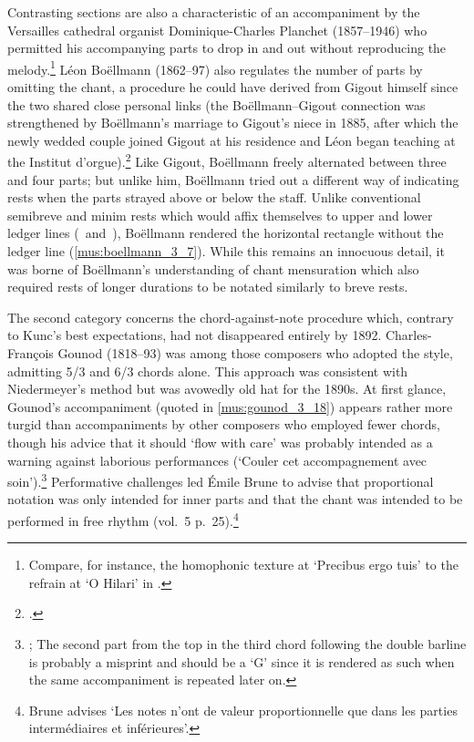 Contrasting sections are also a characteristic of an accompaniment by the Versailles cathedral organist Dominique-Charles Planchet (1857--1946) who permitted his accompanying parts to drop in and out without reproducing the melody.\footnote{Compare, for instance, the homophonic texture at `Precibus ergo tuis' to the refrain at `O Hilari' in \cite[4:6--9]{Melodieschantgregorien1892}.}
Léon Boëllmann (1862--97) also regulates the number of parts by omitting the chant, a procedure he could have derived from Gigout himself since the two shared close personal links (the Boëllmann--Gigout connection was strengthened by Boëllmann's marriage to Gigout's niece in 1885, after which the newly wedded couple joined Gigout at his residence and Léon began teaching at the Institut d'orgue).\footcite[216--17]{OchseOrganistsOrganPlaying2000}
Like Gigout, Boëllmann freely alternated between three and four parts; but unlike him, Boëllmann tried out a different way of indicating rests when the parts strayed above or below the staff.
Unlike conventional semibreve and minim rests which would affix themselves to upper and lower ledger lines (\wholeNoteRest{}~and~\halfNoteRest{}), Boëllmann rendered the horizontal rectangle without the ledger line (\cref{mus:boellmann_3_7}).
While this remains an innocuous detail, it was borne of Boëllmann's understanding of chant mensuration which also required rests of longer durations to be notated similarly to breve rests.

\label{ln:gounod_chordagainstnote}%
The second category concerns the chord-against-note procedure which, contrary to Kunc's best expectations, had not disappeared entirely by 1892.
%
Charles-François Gounod (1818--93) was among those composers who adopted the style, admitting 5/3 and 6/3 chords alone.
This approach was consistent with Niedermeyer's method but was avowedly old hat for the 1890s.
At first glance, Gounod's accompaniment (quoted in \cref{mus:gounod_3_18}) appears rather more turgid than accompaniments by other composers who employed fewer chords, though his advice that it should `flow with care' was probably intended as a warning against laborious performances (`Couler cet accompagnement avec soin').\footnote{\cite[3:7, 13]{Melodieschantgregorien1892}; The second part from the top in the third chord following the double barline is probably a misprint and should be a `G' since it is rendered as such when the same accompaniment is repeated later on.}
Performative challenges led Émile Brune to advise that proportional notation was only intended for inner parts and that the chant was intended to be performed in free rhythm (vol.~5 p.~25).\footnote{Brune advises `Les notes n'ont de valeur proportionnelle que dans les parties intermédiaires et inférieures'.}

